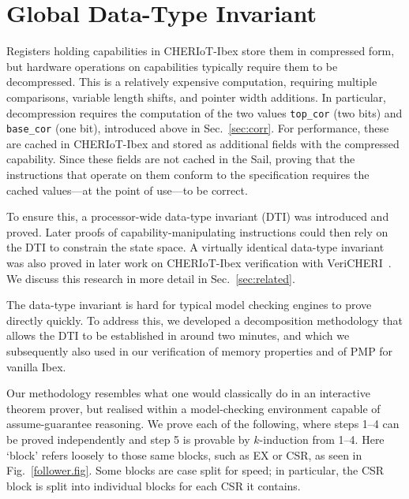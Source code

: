 \documentclass[10pt,conference]{IEEEtran}
\begin{document}
\section{Global Data-Type Invariant}\label{dti:sec}

Registers holding capabilities in CHERIoT-Ibex store them in compressed
form, but hardware operations on capabilities typically require them to be
decompressed. This is a relatively expensive computation, requiring
multiple comparisons, variable length shifts, and pointer width
additions. In particular, decompression requires the computation of the two
values \verb|top_cor| (two bits) and \verb|base_cor| (one bit), introduced above in
Sec.~\ref{sec:corr}. For performance, these are cached in CHERIoT-Ibex and
stored as additional fields with the compressed capability. Since these
fields are not cached in the Sail, proving that the instructions that
operate on them conform to the specification requires the cached
values---at the point of use---to be correct.

To ensure this, a processor-wide data-type invariant (DTI) was introduced
and proved. Later proofs of capability-manipulating instructions could then
rely on the DTI to constrain the state space. A virtually identical
data-type invariant was also proved in later work on CHERIoT-Ibex
verification with VeriCHERI~\cite{vericheri2024}. We discuss this
research in more detail in Sec.~\ref{sec:related}.

The data-type invariant is hard for typical model checking engines to
prove directly quickly. To address this, we developed a decomposition
methodology that allows the DTI to be established in around two minutes,
and which we subsequently also used in our verification of memory
properties and of PMP for vanilla Ibex.

Our methodology resembles what one would classically do in an interactive
theorem prover, but realised within a model-checking environment capable of
assume-guarantee reasoning. We prove each of the following, where steps
1--4 can be proved independently and step 5 is provable by $k$-induction
from 1--4.  Here `block' refers loosely to those same blocks, such as
EX or CSR, as seen in Fig.~\ref{follower.fig}. Some blocks are case split
for speed; in particular, the CSR block is split into individual blocks for
each CSR it contains.
\end{document}
